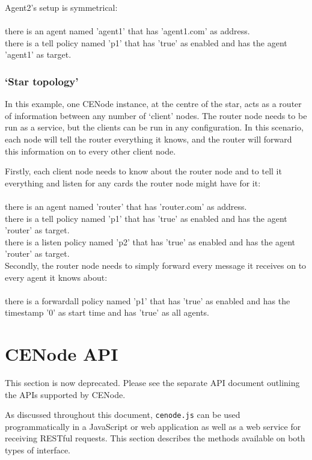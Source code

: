 \documentclass{scrartcl}
\newcommand{\ce}[1]{\textsf{#1}}
\newcommand{\js}[1]{\texttt{#1}}
\begin{document}
Agent2's setup is symmetrical:\\
\\\ce{there is an agent named 'agent1' that has 'agent1.com' as address.\\
there is a tell policy named 'p1' that has 'true' as enabled and has the agent 'agent1' as target.}\\


\subsubsection{`Star topology'}
In this example, one CENode instance, at the centre of the star, acts as a router of information between any number of `client' nodes. The router node needs to be run as a service, but the clients can be run in any configuration. In this scenario, each node will tell the router everything it knows, and the router will forward this information on to every other client node.

Firstly, each client node needs to know about the router node and to tell it everything and listen for any cards the router node might have for it:\\
\\\ce{there is an agent named 'router' that has 'router.com' as address.\\
there is a tell policy named 'p1' that has 'true' as enabled and has the agent 'router' as target.\\
there is a listen policy named 'p2'  that has 'true' as enabled and has the agent 'router' as target.}\\

Secondly, the router node needs to simply forward every message it receives on to every agent it knows about:\\
\\\ce{there is a forwardall policy named 'p1' that has 'true' as enabled and has the timestamp '0' as start time and has 'true' as all agents.}


\section{CENode API}
\label{api}
\begin{emph}
This section is now deprecated. Please see the separate API document outlining the APIs supported by CENode.
\end{emph}
As discussed throughout this document, \js{cenode.js} can be used programmatically in a JavaScript or web application as well as a web service for receiving RESTful requests. This section describes the methods available on both types of interface.
\end{document}
